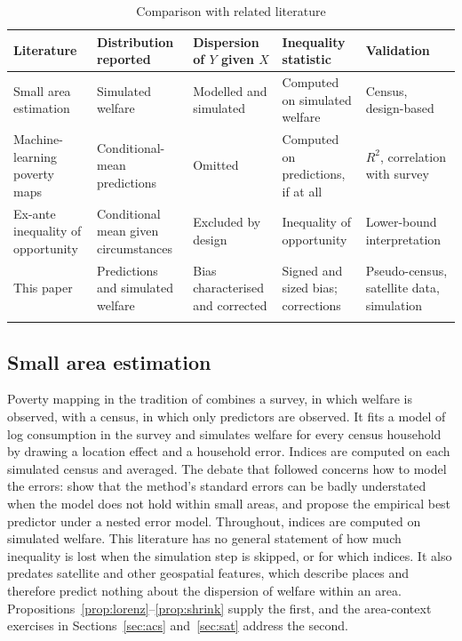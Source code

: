 \documentclass[pdflatex,sn-mathphys-ay]{sn-jnl}
\theoremstyle{thmstyleone}%
\theoremstyle{thmstyletwo}%
\theoremstyle{thmstylethree}%
\begin{document}
\begin{table}[ht]
\caption{Comparison with related literature}\label{tab:position}%
\small
\begin{tabular*}{\textwidth}{@{\extracolsep\fill}>{\raggedright\arraybackslash}p{}>{\raggedright\arraybackslash}p{}>{\raggedright\arraybackslash}p{}>{\raggedright\arraybackslash}p{}>{\raggedright\arraybackslash}p{}@{}}
\toprule
Literature & Distribution reported & Dispersion of $Y$ given $X$ & Inequality statistic & Validation \\
\midrule
Small area estimation & Simulated welfare & Modelled and simulated & Computed on simulated welfare & Census, design-based \\
Machine-learning poverty maps & Conditional-mean predictions & Omitted & Computed on predictions, if at all & $R^2$, correlation with survey \\
Ex-ante inequality of opportunity & Conditional mean given circumstances & Excluded by design & Inequality of opportunity & Lower-bound interpretation \\
\midrule
This paper & Predictions and simulated welfare & Bias characterised and corrected & Signed and sized bias; corrections & Pseudo-census, satellite data, simulation \\
\botrule
\end{tabular*}
\end{table}

\subsection{Small area estimation}\label{sec:lit_sae}
Poverty mapping in the tradition of \citet{ell2003} combines a survey, in which welfare is observed, with a census, in which only predictors are observed. It fits a model of log consumption in the survey and simulates welfare for every census household by drawing a location effect and a household error. Indices are computed on each simulated census and averaged. The debate that followed concerns how to model the errors: \citet{tarozzi2009} show that the method's standard errors can be badly understated when the model does not hold within small areas, and \citet{molina2010} propose the empirical best predictor under a nested error model. Throughout, indices are computed on simulated welfare. This literature has no general statement of how much inequality is lost when the simulation step is skipped, or for which indices. It also predates satellite and other geospatial features, which describe places and therefore predict nothing about the dispersion of welfare within an area. Propositions~\ref{prop:lorenz}--\ref{prop:shrink} supply the first, and the area-context exercises in Sections~\ref{sec:acs} and~\ref{sec:sat} address the second.
\end{document}
